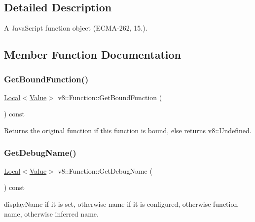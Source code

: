 \subsection{Detailed Description}
A Java\+Script function object (E\+C\+M\+A-\/262, 15.). 

\subsection{Member Function Documentation}
\mbox{\label{classv8_1_1Function_a33bea08b5ff0c605bde07897cf1c431e}} 
\subsubsection{\texorpdfstring{Get\+Bound\+Function()}{GetBoundFunction()}}
{\footnotesize\ttfamily \mbox{\hyperlink{classv8_1_1Local}{Local}}$<$\mbox{\hyperlink{classv8_1_1Value}{Value}}$>$ v8\+::\+Function\+::\+Get\+Bound\+Function (\begin{DoxyParamCaption}{ }\end{DoxyParamCaption}) const}

Returns the original function if this function is bound, else returns v8\+::\+Undefined. \mbox{\label{classv8_1_1Function_a36946ff78ea0448d992957fa164187f1}} 
\subsubsection{\texorpdfstring{Get\+Debug\+Name()}{GetDebugName()}}
{\footnotesize\ttfamily \mbox{\hyperlink{classv8_1_1Local}{Local}}$<$\mbox{\hyperlink{classv8_1_1Value}{Value}}$>$ v8\+::\+Function\+::\+Get\+Debug\+Name (\begin{DoxyParamCaption}{ }\end{DoxyParamCaption}) const}

display\+Name if it is set, otherwise name if it is configured, otherwise function name, otherwise inferred name. \mbox{\label{classv8_1_1Function_aa889eb7452de7c7a695c5981f603c7cb}} 
